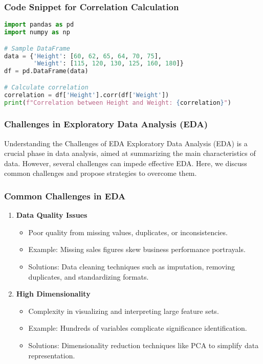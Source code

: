 \documentclass[aspectratio=169]{beamer}
\begin{document}
\begin{frame}[fragile]
    \frametitle{Code Snippet for Correlation Calculation}
    \begin{lstlisting}[language=Python]
import pandas as pd
import numpy as np

# Sample DataFrame
data = {'Height': [60, 62, 65, 64, 70, 75], 
        'Weight': [115, 120, 130, 125, 160, 180]}
df = pd.DataFrame(data)

# Calculate correlation
correlation = df['Height'].corr(df['Weight'])
print(f"Correlation between Height and Weight: {correlation}")
    \end{lstlisting}
\end{frame}

\begin{frame}[fragile]
    \frametitle{Challenges in Exploratory Data Analysis (EDA)}
    \begin{block}{Understanding the Challenges of EDA}
        Exploratory Data Analysis (EDA) is a crucial phase in data analysis, aimed at summarizing the main characteristics of data. However, several challenges can impede effective EDA. Here, we discuss common challenges and propose strategies to overcome them.
    \end{block}
\end{frame}

\begin{frame}[fragile]
    \frametitle{Common Challenges in EDA}
    \begin{enumerate}
        \item \textbf{Data Quality Issues}  
        \begin{itemize}
            \item Poor quality from missing values, duplicates, or inconsistencies. 
            \item Example: Missing sales figures skew business performance portrayals. 
            \item Solutions: Data cleaning techniques such as imputation, removing duplicates, and standardizing formats.
        \end{itemize}
        
        \item \textbf{High Dimensionality}  
        \begin{itemize}
            \item Complexity in visualizing and interpreting large feature sets. 
            \item Example: Hundreds of variables complicate significance identification. 
            \item Solutions: Dimensionality reduction techniques like PCA to simplify data representation.
        \end{itemize}
    \end{enumerate}
\end{frame}
\end{document}
